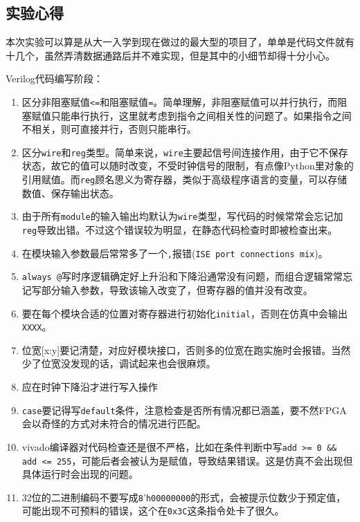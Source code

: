 \documentclass[12pt,UTF8]{ctexart}
\begin{document}
\begin{spacing}{1.1}
\section{实验心得}
\qquad 本次实验可以算是从大一入学到现在做过的最大型的项目了，单单是代码文件就有十几个，虽然弄清数据通路后并不难实现，但是其中的小细节却得十分小心。
\par Verilog代码编写阶段：
\begin{enumerate}
	\item 区分非阻塞赋值\verb'<='和阻塞赋值\verb'='。简单理解，非阻塞赋值可以并行执行，而阻塞赋值只能串行执行，这里就考虑到指令之间相关性的问题了。如果指令之间不相关，则可直接并行，否则只能串行。
    \item 区分\verb'wire'和\verb'reg'类型。简单来说，\verb'wire'主要起信号间连接作用，由于它不保存状态，故它的值可以随时改变，不受时钟信号的限制，有点像Python里对象的引用赋值。而\verb'reg'顾名思义为寄存器，类似于高级程序语言的变量，可以存储数值、保存输出状态。
    \item 由于所有\verb'module'的输入输出均默认为\verb'wire'类型，写代码的时候常常会忘记加\verb'reg'导致出错。不过这个错误较为明显，在静态代码检查时即被检查出来。
    \item 在模块输入参数最后常常多了一个\verb','报错(\verb'ISE port connections mix')。
    \item \verb'always @'写时序逻辑确定好上升沿和下降沿通常没有问题，而组合逻辑常常忘记写部分输入参数，导致该输入改变了，但寄存器的值并没有改变。
    \item 要在每个模块合适的位置对寄存器进行初始化\verb'initial'，否则在仿真中会输出\verb'XXXX'。
    \item 位宽[x:y]要记清楚，对应好模块接口，否则多的位宽在跑实施时会报错。当然少了位宽没发现的话，调试起来也会很麻烦。
    \item 应在时钟下降沿才进行写入操作
    \item \verb'case'要记得写\verb'default'条件，注意检查是否所有情况都已涵盖，要不然FPGA会以奇怪的方式对未符合的情况进行匹配。
    \item vivado编译器对代码检查还是很不严格，比如在条件判断中写\verb'add >= 0 && add <= 255'，可能后者会被认为是赋值，导致结果错误。这是仿真不会出现但具体运行时会出现的问题。
    \item 32位的二进制编码不要写成\verb'8''\verb'h00000000'的形式，会被提示位数少于预定值，可能出现不可预料的错误，这个在\verb'0x3C'这条指令处卡了很久。

\end{enumerate}
\end{spacing}
\end{document}
